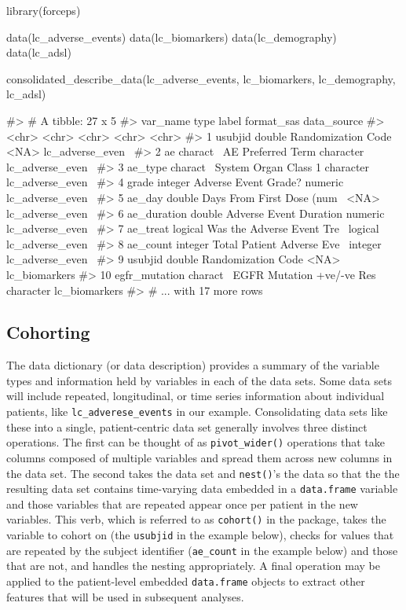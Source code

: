 \begin{Schunk}
\begin{Sinput}
library(forceps)

data(lc_adverse_events)
data(lc_biomarkers)
data(lc_demography)
data(lc_adsl)

consolidated_describe_data(lc_adverse_events,
                           lc_biomarkers,
                           lc_demography,
                           lc_adsl)
\end{Sinput}
\begin{Soutput}
#> # A tibble: 27 x 5
#>    var_name      type     label                      format_sas data_source     
#>    <chr>         <chr>    <chr>                      <chr>      <chr>           
#>  1 usubjid       double   Randomization Code         <NA>       lc_adverse_even~
#>  2 ae            charact~ AE Preferred Term          character  lc_adverse_even~
#>  3 ae_type       charact~ System Organ Class 1       character  lc_adverse_even~
#>  4 grade         integer  Adverse Event Grade?       numeric    lc_adverse_even~
#>  5 ae_day        double   Days From First Dose (num~ <NA>       lc_adverse_even~
#>  6 ae_duration   double   Adverse Event Duration     numeric    lc_adverse_even~
#>  7 ae_treat      logical  Was the Adverse Event Tre~ logical    lc_adverse_even~
#>  8 ae_count      integer  Total Patient Adverse Eve~ integer    lc_adverse_even~
#>  9 usubjid       double   Randomization Code         <NA>       lc_biomarkers   
#> 10 egfr_mutation charact~ EGFR Mutation +ve/-ve Res~ character  lc_biomarkers   
#> # ... with 17 more rows
\end{Soutput}
\end{Schunk}

\hypertarget{cohorting}{%
\subsection{Cohorting}\label{cohorting}}

The data dictionary (or data description) provides a summary of the
variable types and information held by variables in each of the data
sets. Some data sets will include repeated, longitudinal, or time series
information about individual patients, like
\texttt{lc\_adverese\_events} in our example. Consolidating data sets
like these into a single, patient-centric data set generally involves
three distinct operations. The first can be thought of as
\texttt{pivot\_wider()} operations that take columns composed of
multiple variables and spread them across new columns in the data set.
The second takes the data set and \texttt{nest()}'s the data so that the
the resulting data set contains time-varying data embedded in a
\texttt{data.frame} variable and those variables that are repeated
appear once per patient in the new variables. This verb, which is
referred to as \texttt{cohort()} in the package, takes the variable to
cohort on (the \texttt{usubjid} in the example below), checks for values
that are repeated by the subject identifier (\texttt{ae\_count} in the
example below) and those that are not, and handles the nesting
appropriately. A final operation may be applied to the patient-level
embedded \texttt{data.frame} objects to extract other features that will
be used in subsequent analyses.

